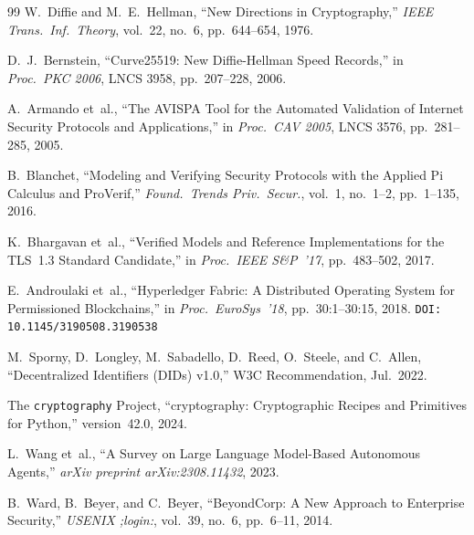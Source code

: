 \documentclass[review,5p,twocolumn,times]{elsarticle}
\begin{document}
\begin{thebibliography}{99}
W.~Diffie and M.~E.~Hellman,
``New Directions in Cryptography,''
\textit{IEEE Trans.\ Inf.\ Theory}, vol.~22, no.~6, pp.~644--654, 1976.

D.~J.~Bernstein,
``Curve25519: New Diffie-Hellman Speed Records,''
in \textit{Proc.\ PKC 2006}, LNCS 3958, pp.~207--228, 2006.


A.~Armando et~al.,
``The AVISPA Tool for the Automated Validation of Internet Security
Protocols and Applications,''
in \textit{Proc.\ CAV 2005}, LNCS 3576, pp.~281--285, 2005.

B.~Blanchet,
``Modeling and Verifying Security Protocols with the Applied Pi Calculus
and ProVerif,''
\textit{Found.\ Trends Priv.\ Secur.}, vol.~1, no.~1--2, pp.~1--135, 2016.

K.~Bhargavan et~al.,
``Verified Models and Reference Implementations for the TLS~1.3 Standard
Candidate,''
in \textit{Proc.\ IEEE S\&P~'17}, pp.~483--502, 2017.


E.~Androulaki et~al.,
``Hyperledger Fabric: A Distributed Operating System for Permissioned
Blockchains,''
in \textit{Proc.\ EuroSys~'18}, pp.~30:1--30:15, 2018.
\texttt{DOI: 10.1145/3190508.3190538}

M.~Sporny, D.~Longley, M.~Sabadello, D.~Reed, O.~Steele, and C.~Allen,
``Decentralized Identifiers (DIDs) v1.0,''
W3C Recommendation, Jul.\ 2022.

The \texttt{cryptography} Project,
``cryptography: Cryptographic Recipes and Primitives for Python,''
version~42.0, 2024.


L.~Wang et~al.,
``A Survey on Large Language Model-Based Autonomous Agents,''
\textit{arXiv preprint arXiv:2308.11432}, 2023.

B.~Ward, B.~Beyer, and C.~Beyer,
``BeyondCorp: A New Approach to Enterprise Security,''
\textit{USENIX ;login:}, vol.~39, no.~6, pp.~6--11, 2014.

\end{thebibliography}
\end{document}
